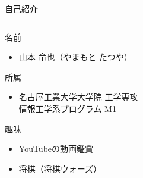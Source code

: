 \documentclass[12pt, unicode]{beamer}
\begin{document}
\begin{frame}{自己紹介}
  \begin{columns}
    \begin{column}{0.7\textwidth}
      \begin{block}{名前}
        \begin{itemize}
          \item 山本 竜也（やまもと たつや）
        \end{itemize}
      \end{block}

      \begin{block}{所属}
        \begin{itemize}
          \item 名古屋工業大学大学院 工学専攻\\情報工学系プログラム M1
        \end{itemize}
      \end{block}

      \begin{block}{趣味}
        \begin{itemize}
          \item YouTubeの動画鑑賞
          \item 将棋（将棋ウォーズ）
        \end{itemize}
      \end{block}
    \end{column}


\end{columns}
\end{frame}
\end{document}

